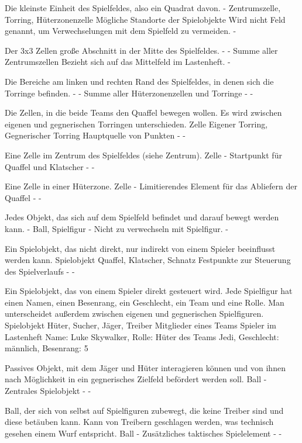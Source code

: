 {Die kleinste Einheit des Spielfeldes, also ein Quadrat davon.}
{-}
{Zentrumszelle, Torring, Hüterzonenzelle}
{Mögliche Standorte der Spielobjekte}
{Wird nicht Feld genannt, um Verwechselungen mit dem Spielfeld zu vermeiden.}
{-}

{Der 3x3 Zellen große Abschnitt in der Mitte des Spielfeldes.}
{-}
{-}
{Summe aller Zentrumszellen}
{Bezieht sich auf das Mittelfeld im Lastenheft.}
{-}

{Die Bereiche am linken und rechten Rand des Spielfeldes, in denen sich die Torringe befinden.}
{-}
{-}
{Summe aller Hüterzonenzellen und Torringe}
{-}
{-}

{Die Zellen, in die beide Teams den Quaffel bewegen wollen. Es wird zwischen eigenen und gegnerischen Torringen unterschieden.}
{Zelle}
{Eigener Torring, Gegnerischer Torring}
{Hauptquelle von Punkten}
{-}
{-}

{Eine Zelle im Zentrum des Spielfeldes (siehe Zentrum).}
{Zelle}
{-}
{Startpunkt für Quaffel und Klatscher}
{-}
{-}

{Eine Zelle in einer Hüterzone.}
{Zelle}
{-}
{Limitierendes Element für das Abliefern der Quaffel}
{-}
{-}

{Jedes Objekt, das sich auf dem Spielfeld befindet und darauf bewegt werden kann.}
{-}
{Ball, Spielfigur}
{-}
{Nicht zu verwechseln mit Spielfigur.}
{-}

{Ein Spielobjekt, das nicht direkt, nur indirekt von einem Spieler beeinflusst werden kann.}
{Spielobjekt}
{Quaffel, Klatscher, Schnatz}
{Festpunkte zur Steuerung des Spielverlaufs}
{-}
{-}

{Ein Spielobjekt, das von einem Spieler direkt gesteuert wird. Jede Spielfigur hat einen Namen, einen Besenrang, ein Geschlecht, ein Team und eine Rolle. Man unterscheidet außerdem zwischen eigenen und gegnerischen Spielfiguren.}
{Spielobjekt}
{Hüter, Sucher, Jäger, Treiber}
{Mitglieder eines Teams}
{Spieler im Lastenheft}
{Name: Luke Skywalker, Rolle: Hüter des Teams \glqq{}Jedi\grqq{}, Geschlecht: männlich, Besenrang: 5}

{Passives Objekt, mit dem Jäger und Hüter interagieren können und von ihnen nach Möglichkeit in ein gegnerisches Zielfeld befördert werden soll.}
{Ball}
{-}
{Zentrales Spielobjekt}
{-}
{-}

{Ball, der sich von selbst auf Spielfiguren zubewegt, die keine Treiber sind und diese betäuben kann. Kann von Treibern geschlagen werden, was technisch gesehen einem Wurf entspricht.}
{Ball}
{-}
{Zusätzliches taktisches Spielelement}
{-}
{-}

